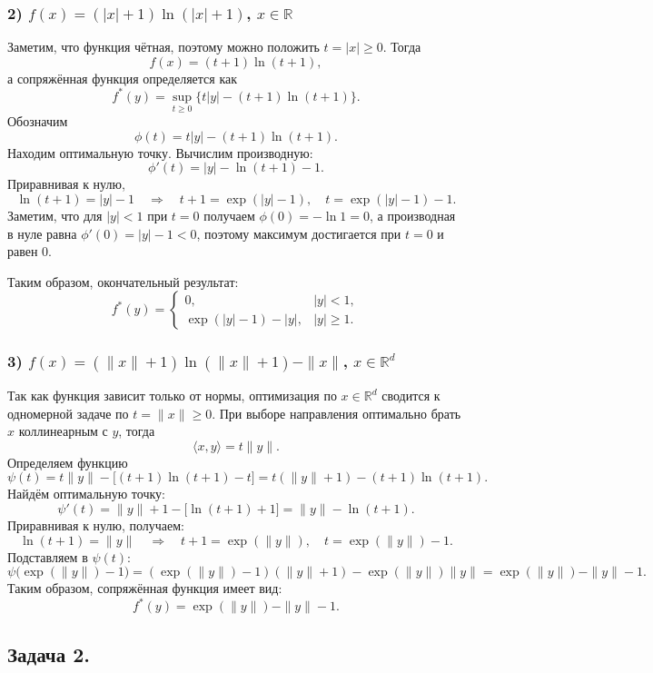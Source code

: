\documentclass[a4paper,12pt]{article}
\begin{document}
	\vspace{2mm}
	
	\subsubsection*{2) $f(x)=(|x|+1)\ln(|x|+1)$, $x\in\mathbb{R}$}
	
	Заметим, что функция чётная, поэтому можно положить $t=|x|\ge0$. Тогда
	\[
	f(x)= (t+1)\ln(t+1),
	\]
	а сопряжённая функция определяется как
	\[
	f^*(y)=\sup_{t\ge0}\Big\{t|y|-(t+1)\ln(t+1)\Big\}.
	\]
	Обозначим
	\[
	\phi(t)= t|y|-(t+1)\ln(t+1).
	\]
	Находим оптимальную точку. Вычислим производную:
	\[
	\phi'(t)=|y|-\ln(t+1)-1.
	\]
	Приравнивая к нулю,
	\[
	\ln(t+1)=|y|-1 \quad \Longrightarrow \quad t+1=\exp(|y|-1),\quad t=\exp(|y|-1)-1.
	\]
	Заметим, что для $|y|<1$ при $t=0$ получаем $\phi(0)= -\ln1=0$, а производная в нуле равна $\phi'(0)=|y|-1<0$, поэтому максимум достигается при $t=0$ и равен 0.
	
	Таким образом, окончательный результат:
	\[
	f^*(y)=
	\begin{cases}
		0, & |y|<1,\\[1mm]
		\exp(|y|-1)-|y|, & |y|\ge1.
	\end{cases}
	\]
	
	\subsubsection*{3) $f(x)=(\|x\|+1)\ln(\|x\|+1)-\|x\|$, $x\in\mathbb{R}^d$}
	
	Так как функция зависит только от нормы, оптимизация по $x\in\mathbb{R}^d$ сводится к одномерной задаче по $t=\|x\|\ge0$. При выборе направления оптимально брать $x$ коллинеарным с $y$, тогда
	\[
	\langle x,y\rangle = t\|y\|.
	\]
	Определяем функцию
	\[
	\psi(t)= t\|y\| - \Big[(t+1)\ln(t+1)-t\Big] = t(\|y\|+1) - (t+1)\ln(t+1).
	\]
	Найдём оптимальную точку:
	\[
	\psi'(t)=\|y\|+1 - \big[\ln(t+1)+1\big] = \|y\|-\ln(t+1).
	\]
	Приравнивая к нулю, получаем:
	\[
	\ln(t+1)=\|y\| \quad \Longrightarrow \quad t+1=\exp(\|y\|),\quad t=\exp(\|y\|)-1.
	\]
	Подставляем в $\psi(t)$:
	\[
	\psi\Big(\exp(\|y\|)-1\Big)= (\exp(\|y\|)-1)(\|y\|+1) - \exp(\|y\|)\|y\| 
	=\exp(\|y\|)-\|y\|-1.
	\]
	Таким образом, сопряжённая функция имеет вид:
	\[
	f^*(y)=\exp(\|y\|)-\|y\|-1.
	\]
	
	\vspace{3mm}
	
	\subsection*{Задача 2.}
	
\end{document}
